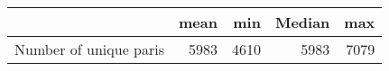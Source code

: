 \begin{tabular}{lrrrr}
\toprule
{} &  mean &   min &  Median &   max \\
\midrule
Number of unique paris &  5983 &  4610 &    5983 &  7079 \\
\bottomrule
\end{tabular}
